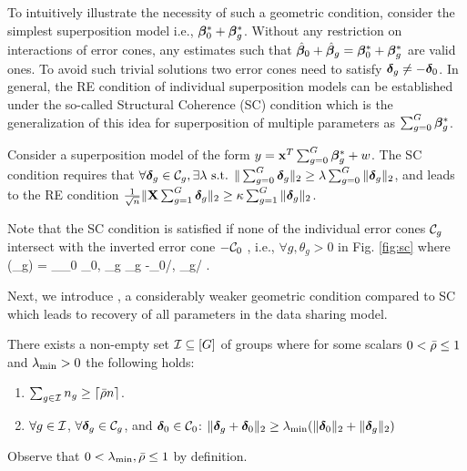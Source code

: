 To intuitively illustrate the necessity of such a geometric condition, consider the simplest superposition model i.e., $\boldsymbol{\beta}^*_0 + \boldsymbol{\beta}^*_g$. Without any restriction on interactions of error cones, any estimates such that $\hat{\boldsymbol{\beta}}_0 + \hat{\boldsymbol{\beta}}_g = \boldsymbol{\beta}^*_0 + \boldsymbol{\beta}^*_g$ are valid ones. To avoid such trivial solutions two error cones need to satisfy $\boldsymbol{\delta}_g \neq -\boldsymbol{\delta}_0$. In general, the RE condition of individual superposition models can be established under the so-called Structural Coherence (SC) condition \cite{guba16, mctr13} which is the generalization of this idea for superposition of multiple parameters as $\sum_{g = 0}^{G} \boldsymbol{\beta}^*_g$.
 
\begin{definition} \label{scc}
	Consider a superposition model of the form $y = \mathbf{x}^T \sum_{g = 0}^{G} \boldsymbol{\beta}^*_g + w$. The SC condition requires that
$	\forall \ddelta_g \in \cC_g, \exists \lambda \text{ s.t. }  \norm{\sum_{g = 0}^{G} \ddelta_g}{2} \geq  \lambda \sum_{g = 0}^{G}  \norm{\ddelta_g}{2}$,
	and leads to the RE condition $\frac{1}{\sqrt{n}}\|\mathbf{X} \sum_{g = 1}^{G} \boldsymbol{\delta}_g\|_{2} \geq \kappa \sum_{g=1}^{G} \|\boldsymbol{\delta}_g\|_{2}$.
\end{definition}

\begin{remark}
	Note that the SC condition is satisfied if none of the individual error cones $\cC_g$ intersect with the inverted error cone $-\cC_0$ \cite{guba16, trop15}, i.e., $\forall g, \theta_g > 0$ in Fig. \ref{fig:sc} where 
	\be 
	\nr 
	\cos(\theta_g) = \sup_{\ddelta_0 \in \cC_0, \ddelta_g \in \cC_g} -\langle \ddelta_0/, \ddelta_g/ \rangle.
	\ee
\end{remark}
Next, we introduce \ds, a considerably weaker geometric condition compared to SC which leads to recovery of all parameters in the data sharing model. 
\begin{definition}  \label{incodef}
	There exists a non-empty set $\cI\subseteq [G]$ of groups where for some scalars $0 < \bar{\rho}\leq 1$ and $\lambda_{\min}>0$ the following holds:
	\begin{enumerate}
		\item $\sum_{g\in \cI} n_g\geq \lceil \ratio n\rceil$.
		\item $\forall g \in \cI$, $\forall \ddelta_g \in \cC_g$, and $\ddelta_0\in\cC_0$: $\|\boldsymbol{\delta}_g+\boldsymbol{\delta}_0\|_{2}\geq \lambda_{\min} (\|\boldsymbol{\delta}_0\|_{2}+\|\boldsymbol{\delta}_g\|_{2})$
	\end{enumerate}
	Observe that $0 < \lambda_{\min},\bar{\rho}\leq 1$ by definition.
\end{definition}

